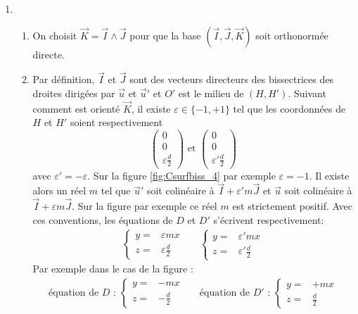 \begin{enumerate}
\item \begin{enumerate}
 \item On choisit $\overrightarrow K = \overrightarrow I \wedge \overrightarrow J$ pour que la base $(\overrightarrow I , \overrightarrow J , \overrightarrow K)$ soit orthonormée directe.
\item Par définition, $\overrightarrow I$ et $\overrightarrow J$ sont des vecteurs directeurs des bissectrices des droites dirigées par $\overrightarrow u$ et $\overrightarrow u'$ et $O'$ est le milieu de $(H,H')$.\newline
Suivant comment est orienté $\overrightarrow K$, il existe $\varepsilon\in\{-1,+1\}$ tel que les coordonnées de $H$ et $H'$ soient respectivement 
\begin{displaymath}
 \begin{pmatrix}
  0\\0\\ \varepsilon\frac{d}{2}
 \end{pmatrix}
\text{ et }
 \begin{pmatrix}
  0\\0\\ \varepsilon'\frac{d}{2}
 \end{pmatrix}
\end{displaymath}
avec $\varepsilon'=-\varepsilon$. Sur la figure \ref{fig:Csurfbiss_4} par exemple $\varepsilon =-1$.
Il existe alors un réel $m$ tel que $\overrightarrow u'$ soit colinéaire à $\overrightarrow I +\varepsilon' m\overrightarrow J$ et $\overrightarrow u$ soit colinéaire à $\overrightarrow I +\varepsilon m\overrightarrow J$. Sur la figure  par exemple ce réel $m$ est strictement positif.\newline
Avec ces conventions, les équations de $D$ et $D'$ s'écrivent respectivement:
\begin{align*}
 \left\lbrace 
\begin{aligned}
 y =& \varepsilon m x\\
 z =& \varepsilon \frac{d}{2}
\end{aligned}
\right. 
& &
 \left\lbrace 
\begin{aligned}
 y =& \varepsilon' m x\\
 z =& \varepsilon' \frac{d}{2}
\end{aligned}
\right. 
\end{align*}
Par exemple dans le cas de la figure :
\begin{align*}
 \text{équation de $D$ : }
\left\lbrace 
\begin{aligned}
 y =& - m x\\
 z =& -\frac{d}{2}
\end{aligned}
\right. 
 & &
 \text{équation de $D'$ : }
\left\lbrace 
\begin{aligned}
 y =& + m x\\
 z =& \frac{d}{2}
\end{aligned}
\right. 
\end{align*}


\end{enumerate}
\end{enumerate}
